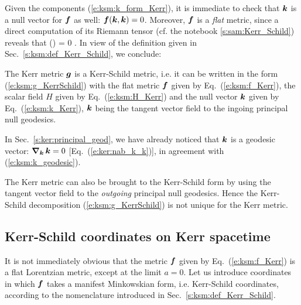 Given the components (\ref{e:ksm:k_form_Kerr}), it is immediate to check that $\bm{k}$ is a null vector for $\bm{f}$ as well: $\bm{f}(\bm{k}, \bm{k}) = 0$.
Moreover, $\bm{f}$ is a \emph{flat} metric, since a direct computation of its
Riemann tensor (cf. the notebook \ref{s:sam:Kerr_Schild}) reveals that
\be
    () = 0 .
\ee
In view of the definition given in Sec.~\ref{s:ksm:def_Kerr_Schild},
we conclude:
\begin{prop}
The Kerr metric $\bm{g}$ is a Kerr-Schild metric, i.e. it can be written in
the form (\ref{e:ksm:g_KerrSchild}) with the flat metric
$\bm{f}$ given by Eq.~(\ref{e:ksm:f_Kerr}), the scalar field $H$ given
by Eq.~(\ref{e:ksm:H_Kerr}) and the null vector $\bm{k}$ given by
Eq.~(\ref{e:ksm:k_Kerr}), $\bm{k}$ being the tangent vector field to
the ingoing principal null geodesics.
\end{prop}
In Sec.~\ref{s:ker:principal_geod},
we have already noticed that $\bm{k}$ is a geodesic vector:
$\bm{\nabla}_{\bm{k}}\, \bm{k} = 0$ [Eq.~(\ref{e:ker:nab_k_k})], in agreement with
(\ref{e:ksm:k_geodesic}).

\begin{remark}
The Kerr metric can also be brought to the Kerr-Schild form by using the
tangent vector field to the  \emph{outgoing} principal null geodesics. Hence
the Kerr-Schild decomposition (\ref{e:ksm:g_KerrSchild}) is not unique for
the Kerr metric.
\end{remark}

\subsection{Kerr-Schild coordinates on Kerr spacetime}

It is not immediately obvious that the metric $\bm{f}$ given by
Eq.~(\ref{e:ksm:f_Kerr}) is a flat Lorentzian metric, except at the limit $a=0$.
Let us introduce coordinates in which $\bm{f}$ takes a manifest Minkowskian
form, i.e. Kerr-Schild coordinates, according to the nomenclature introduced
in Sec.~\ref{s:ksm:def_Kerr_Schild}.

